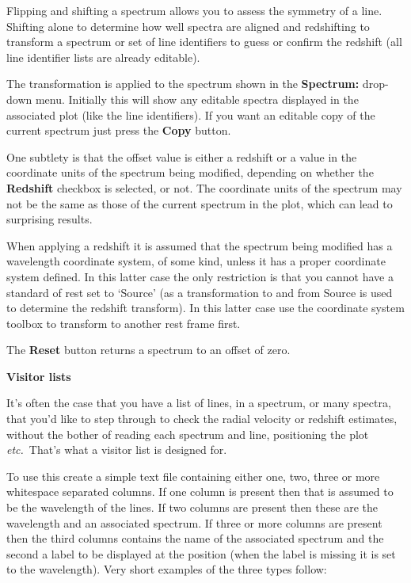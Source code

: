\documentclass[twoside,11pt]{article}
\renewcommand{\_}{\texttt{\symbol{95}}}
\newcommand{\labelitem}[1]{\textbf{#1}}
\newcommand{\etc}{\textit{etc.}}
\newcommand{\subheading}[1]{\textbf{\large{#1}}}
\begin{document}
Flipping and shifting a spectrum allows you to assess the symmetry of a
line. Shifting alone to determine how well spectra are aligned and redshifting
to transform a spectrum or set of line identifiers to guess or confirm the
redshift (all line identifier lists are already editable).

The transformation is applied to the spectrum shown in the
\labelitem{Spectrum:} drop-down menu. Initially this will show any editable
spectra displayed in the associated plot (like the line identifiers).
If you want an editable copy of the current spectrum just press the
\labelitem{Copy} button.

One subtlety is that the offset value is either a redshift or a value in the
coordinate units of the spectrum being modified, depending on whether the
\labelitem{Redshift} checkbox is selected, or not. The coordinate units of
the spectrum may not be the same as those of the current spectrum in the plot,
which can lead to surprising results.

When applying a redshift it is assumed that the spectrum being modified has a
wavelength coordinate system, of some kind, unless it has a proper coordinate
system defined. In this latter case the only restriction is that you cannot
have a standard of rest set to `Source' (as a transformation to and from
Source is used to determine the redshift transform). In this latter case use
the coordinate system toolbox to transform to another rest frame first.

The \labelitem{Reset} button returns a spectrum to an offset of zero.

\subheading{Visitor lists}

It's often the case that you have a list of lines, in a spectrum, or many
spectra, that you'd like to step through to check the radial velocity or
redshift estimates, without the bother of reading each spectrum and line,
positioning the plot \etc\ That's what a visitor list is designed for.

To use this create a simple text file containing either one, two, three
or more whitespace separated columns. If one column is present then that is
assumed to be the wavelength of the lines. If two columns are present then
these are the wavelength and an associated spectrum. If three or more columns
are present then the third columns contains the name of the associated
spectrum and the second a label to be displayed at the position (when the
label is missing it is set to the wavelength). Very short examples of the
three types follow:
\end{document}
